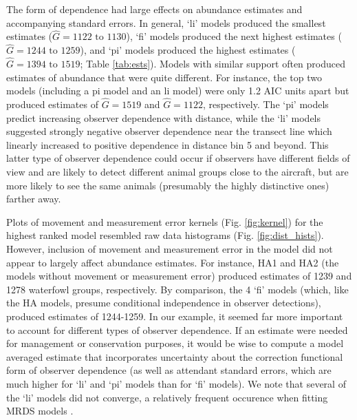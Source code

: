 \documentclass[aoas,preprint]{imsart}
\numberwithin{equation}{section}
\theoremstyle{plain}
\begin{document}
The form of dependence had large effects on abundance estimates and accompanying standard errors. In general, `li' models produced the smallest estimates ($\hat{G}= 1122 \text{ to } 1130$), `fi' models produced the next highest estimates ($\hat{G}= 1244 \text{ to } 1259$), and `pi' models produced the highest estimates ($\hat{G}= 1394 \text{ to } 1519$; Table \ref{tab:ests}).  Models with similar support often produced estimates of abundance that were quite different.  For instance, the top two models (including a pi model and an li model) were only 1.2 AIC units apart but produced estimates of $\hat{G}=1519$ and $\hat{G}=1122$, respectively.  The `pi' models predict increasing observer dependence with distance, while the `li' models suggested strongly negative observer dependence near the transect line which linearly increased to positive dependence in distance bin 5 and beyond.  This latter type of observer dependence could occur if observers have different fields of view and are likely to detect different animal groups close to the aircraft, but are more likely to see the same animals (presumably the highly distinctive ones) farther away. 

Plots of movement and measurement error kernels (Fig. \ref{fig:kernel}) for the highest ranked model resembled raw data histograms (Fig. \ref{fig:dist_hists}).  However, inclusion of movement and measurement error in the model did not appear to largely affect abundance estimates.  For instance, HA1 and HA2 (the models without movement or measurement error) produced estimates of 1239 and 1278 waterfowl groups, respectively.  By comparison, the 4 `fi' models (which, like the HA models, presume conditional independence in observer detections), produced estimates of 1244-1259.   In our example, it seemed far more important to account for different types of observer dependence.  If an estimate were needed for management or conservation purposes, it would be wise to compute a model averaged estimate that incorporates uncertainty about the correction functional form of observer dependence (as well as attendant standard errors, which are much higher for `li' and `pi' models than for `fi' models).  We note that several of the `li' models did not converge, a relatively frequent occurence when fitting MRDS models \citep{BucklandEtAl2010,MacKenzieClement2016}.
\end{document}
